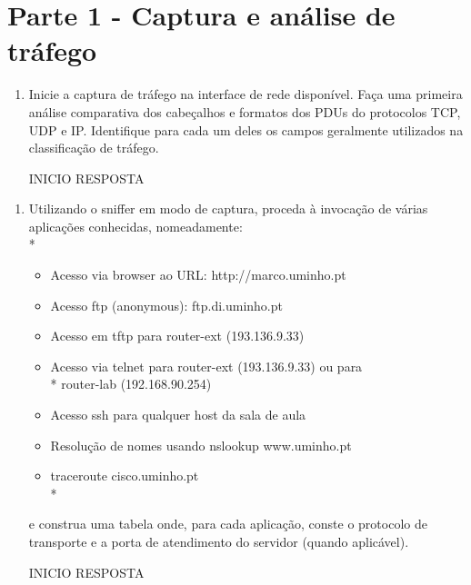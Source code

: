 \documentclass{llncs}
\begin{document}
%
\section{Parte 1 - Captura e análise de tráfego}


\begin{enumerate}[a]
  \item Inicie a captura de tráfego na interface de rede disponível. Faça uma primeira análise comparativa dos
  cabeçalhos e formatos dos PDUs do protocolos TCP, UDP e IP. Identifique para cada um deles os campos
  geralmente utilizados na classificação de tráfego.
  \begin{flushleft}
    INICIO RESPOSTA
  \end{flushleft}
\end{enumerate}

\begin{enumerate}[b]
  \item Utilizando o sniffer em modo de captura, proceda à invocação de várias aplicações conhecidas, nomeadamente:\\*
  \begin{itemize}
      \item Acesso via browser ao URL: http://marco.uminho.pt
      \item Acesso ftp (anonymous): ftp.di.uminho.pt
      \item Acesso em tftp para router-ext (193.136.9.33)
      \item Acesso via telnet para router-ext (193.136.9.33) ou para\\*
      router-lab (192.168.90.254)
      \item Acesso ssh para qualquer host da sala de aula
      \item Resolução de nomes usando nslookup www.uminho.pt
      \item traceroute cisco.uminho.pt\\*
  \end{itemize}
  \par e construa uma tabela onde, para cada aplicação, conste o protocolo de transporte e a porta de atendimento do
  servidor (quando aplicável).
  
  \begin{flushleft}
    INICIO RESPOSTA
  \end{flushleft}
\end{enumerate}
\end{document}
